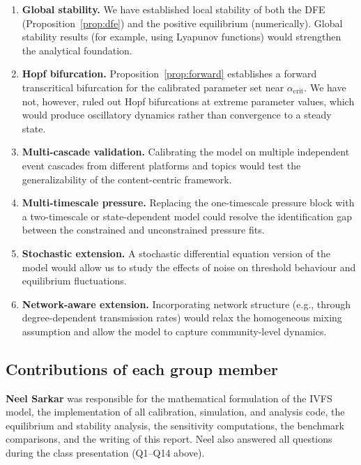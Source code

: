 \documentclass[11pt]{article}
\begin{document}
\begin{enumerate}[leftmargin=1.5em]
    \item \textbf{Global stability.} We have established local stability of both the DFE (Proposition~\ref{prop:dfe}) and the positive equilibrium (numerically). Global stability results (for example, using Lyapunov functions) would strengthen the analytical foundation.

    \item \textbf{Hopf bifurcation.} Proposition~\ref{prop:forward} establishes a forward transcritical bifurcation for the calibrated parameter set near $\alpha_{\mathrm{crit}}$. We have not, however, ruled out Hopf bifurcations at extreme parameter values, which would produce oscillatory dynamics rather than convergence to a steady state.

    \item \textbf{Multi-cascade validation.} Calibrating the model on multiple independent event cascades from different platforms and topics would test the generalizability of the content-centric framework.

    \item \textbf{Multi-timescale pressure.} Replacing the one-timescale pressure block with a two-timescale or state-dependent model could resolve the identification gap between the constrained and unconstrained pressure fits.

    \item \textbf{Stochastic extension.} A stochastic differential equation version of the model would allow us to study the effects of noise on threshold behaviour and equilibrium fluctuations.

    \item \textbf{Network-aware extension.} Incorporating network structure (e.g., through degree-dependent transmission rates) would relax the homogeneous mixing assumption and allow the model to capture community-level dynamics.
\end{enumerate}

\subsection{Contributions of each group member}
\label{sec:contributions}

\textbf{Neel Sarkar} was responsible for the mathematical formulation of the IVFS model, the implementation of all calibration, simulation, and analysis code, the equilibrium and stability analysis, the sensitivity computations, the benchmark comparisons, and the writing of this report. Neel also answered all questions during the class presentation (Q1--Q14 above).
\end{document}
